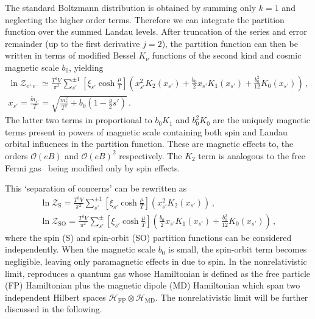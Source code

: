 The standard Boltzmann distribution is obtained by summing only $k=1$ and neglecting the higher order terms. Therefore we can integrate the partition function over the summed Landau levels. After truncation of the series and error remainder (up to the first derivative $j=2$), the partition function  can then be written in terms of modified Bessel $K_{\nu}$ functions of the second kind and cosmic magnetic scale $b_{0}$, yielding
\begin{gather}
 \label{boltzmann}
 \ln\mathcal{Z}_{e^{+}e^{-}}\simeq\frac{T^{3}V}{\pi^{2}}\sum_{s'}^{\pm1}\left[\xi_{s'}\cosh{\frac{\mu}{T}}\right]
 \left(x_{s'}^{2}K_{2}(x_{s'})+\frac{b_{0}}{2}x_{s'}K_{1}(x_{s'})+\frac{b_{0}^{2}}{12}K_{0}(x_{s'})\right)\,,\\
 \label{xfunc}
 x_{s'}=\frac{{\tilde m}_{s'}}{T}=\sqrt{\frac{m_{e}^{2}}{T^{2}}+b_{0}\left(1-\frac{g}{2}s'\right)}\,.
\end{gather}
The latter two terms in  proportional to $b_{0}K_{1}$ and $b_{0}^{2}K_{0}$ are the uniquely magnetic terms present in powers of magnetic scale  containing both spin and Landau orbital influences in the partition function. These are magnetic effects to, the orders $\mathcal{O}(eB)$ and $\mathcal{O}(eB)^2$ respectively. The $K_{2}$ term is analogous to the free Fermi gas~\cite{greiner2012thermodynamics} being modified only by spin effects.

This `separation of concerns' can be rewritten as
\begin{gather}
 \label{spin}
 \ln\mathcal{Z}_\mathrm{S}=\frac{T^{3}V}{\pi^{2}}\sum_{s'}^{\pm1}\left[\xi_{s'}\cosh{\frac{\mu}{T}}\right]\left(x_{s'}^{2}K_{2}(x_{s'})\right)\,,\\
 \label{spinorbit}
 \ln\mathcal{Z}_\mathrm{SO}=\frac{T^{3}V}{\pi^{2}}\sum_{s'}^{\pm}\left[\xi_{s'}\cosh{\frac{\mu}{T}}\right]
 \left(\frac{b_{0}}{2}x_{s'}K_{1}(x_{s'})+\frac{b_{0}^{2}}{12}K_{0}(x_{s'})\right)\,, 
\end{gather}
where the spin (S) and spin-orbit (SO) partition functions can be considered independently. When the magnetic scale $b_{0}$ is small, the spin-orbit term  becomes negligible, leaving only paramagnetic effects in  due to spin. In the nonrelativistic limit,  reproduces a quantum gas whose Hamiltonian is defined as the free particle (FP) Hamiltonian plus the magnetic dipole (MD) Hamiltonian which span two independent Hilbert spaces $\mathcal{H}_\mathrm{FP}\otimes\mathcal{H}_\mathrm{MD}$. The nonrelativistic limit will be further discussed in the following.%

